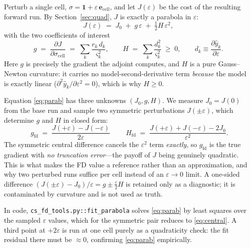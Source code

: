 \documentclass[12pt]{article}
\newcommand{\bm}[1]{\mathbf{#1}}
\newcommand{\gfit}{g_{\mathrm{fd}}}
\begin{document}
Perturb a single cell, $\sigma = \bm{1} + \varepsilon\,\bm{e}_{\mathrm{cell}}$,
and let $J(\varepsilon)$ be the cost of the resulting forward run. By
Section~\ref{sec:quad}, $J$ is exactly a parabola in $\varepsilon$:
%
\begin{equation}
  J(\varepsilon) \;=\; J_0 \;+\; g\,\varepsilon \;+\; \tfrac{1}{2}H\,\varepsilon^2,
  \label{eq:parab}
\end{equation}
%
with the two coefficients of interest
%
\begin{equation}
  g \;=\; \frac{\partial J}{\partial \sigma_{\mathrm{cell}}}
       \;=\; \sum_k \frac{r_k\,d_k}{\varsigma_k^{2}},
  \qquad
  H \;=\; \sum_k \frac{d_k^{2}}{\varsigma_k^{2}} \;\ge\; 0,
  \qquad d_k \equiv \frac{\partial \hat{y}_k}{\partial \varepsilon}.
  \label{eq:gH}
\end{equation}
%
Here $g$ is precisely the gradient the adjoint computes, and $H$ is a pure
Gauss--Newton curvature: it carries no model-second-derivative term \emph{because}
the model is exactly linear ($\partial^2\hat{y}_k/\partial\varepsilon^2 = 0$),
which is why $H\ge 0$.

Equation \eqref{eq:parab} has three unknowns $(J_0,g,H)$. We measure
$J_0=J(0)$ from the base run and sample two symmetric perturbations $J(\pm\varepsilon)$,
which determine $g$ and $H$ in closed form:
%
\begin{equation}
  \boxed{\;\gfit \;=\; \frac{J(+\varepsilon) - J(-\varepsilon)}{2\varepsilon}\;}
  \qquad
  H_{\mathrm{fd}} \;=\; \frac{J(+\varepsilon) + J(-\varepsilon) - 2J_0}{\varepsilon^{2}}.
  \label{eq:central}
\end{equation}
%
The symmetric central difference cancels the $\varepsilon^2$ term \emph{exactly},
so $\gfit$ is the true gradient with \emph{no truncation error}---the payoff of
$J$ being genuinely quadratic. This is what makes the FD value a reference rather
than an approximation, and why two perturbed runs suffice per cell instead of an
$\varepsilon\to 0$ limit. A one-sided difference
$(J(\pm\varepsilon)-J_0)/\varepsilon = g \pm \tfrac{\varepsilon}{2}H$ is retained
only as a diagnostic; it is contaminated by curvature and is not used as truth.

In code, \texttt{cs\_fd\_tools.py::fit\_parabola} solves \eqref{eq:parab} by least
squares over the sampled $\varepsilon$ values, which for the symmetric pair reduces
to \eqref{eq:central}. A third point at $+2\varepsilon$ is run at one cell purely
as a quadraticity check: the fit residual there must be $\approx 0$, confirming
\eqref{eq:parab} empirically.
\end{document}
